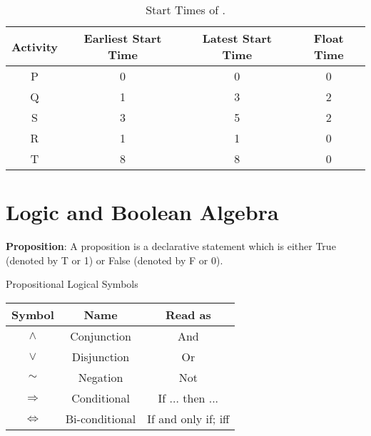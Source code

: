 \begin{table}[H]
	\centering
	\begin{tabular}{|c|c|c|c|}
		\hline 
		Activity & Earliest Start Time & Latest Start Time & Float Time \\
		\hline 
		P & 0 & 0 & 0 \\
		Q & 1 & 3 & 2 \\
		S & 3 & 5 & 2 \\
		R & 1 & 1 & 0 \\
		T & 8 & 8 & 0 \\
		\hline
	\end{tabular}
	\caption{\label{mod1:ActNetTab}Start Times of .}
\end{table}

\section{Logic and Boolean Algebra}

\begin{defn}\label{mod1:defn:Proposition}
   \textbf{Proposition}: A proposition is a declarative statement which is either True (denoted by T or 1) or False (denoted by F or 0).
\end{defn}

\begin{defn}\label{mod1:defn:LogicSymbols}
   Propositional Logical Symbols
      
   \begin{table}[H]
      \centering
      \begin{tabular}{|c|c|c|}
         \hline
            Symbol & Name & Read as\\
         \hline
         $\boldsymbol{\land}$ & Conjunction & And \\
         $\boldsymbol{\lor}$ &   Disjunction & Or \\
         $\boldsymbol{\sim}$ & Negation & Not\\
         $\boldsymbol{\Rightarrow}$ & Conditional & If ... then ...\\
         $\boldsymbol{\Leftrightarrow}$ & Bi-conditional & If and only if; iff\\
         \hline
      \end{tabular}
      \label{mod1:tab:LogicSymbols}
   \end{table}

\end{defn}      

